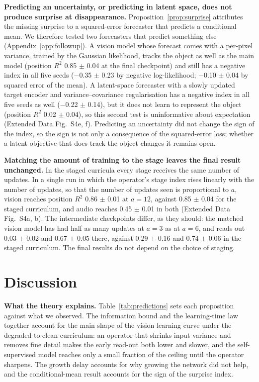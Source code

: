 \documentclass{article}
\theoremstyle{plain}
\theoremstyle{remark}
\begin{document}
\textbf{Predicting an uncertainty, or predicting in latent space, does not produce surprise at disappearance.} Proposition~\ref{prop:surprise} attributes the missing surprise to a squared-error forecaster that predicts a conditional mean. We therefore tested two forecasters that predict something else (Appendix~\ref{app:followup}). A vision model whose forecast comes with a per-pixel variance, trained by the Gaussian likelihood, tracks the object as well as the main model (position \(R^2\) 0.85 \ensuremath{\pm} 0.04 at the final checkpoint) and still has a negative index in all five seeds (\ensuremath{-}0.35 \ensuremath{\pm} 0.23 by negative log-likelihood; \ensuremath{-}0.10 \ensuremath{\pm} 0.04 by squared error of the mean). A latent-space forecaster with a slowly updated target encoder and variance--covariance regularisation has a negative index in all five seeds as well (\ensuremath{-}0.22 \ensuremath{\pm} 0.14), but it does not learn to represent the object (position \(R^2\) 0.02 \ensuremath{\pm} 0.04), so this second test is uninformative about expectation (Extended Data Fig.~S4e, f). Predicting an uncertainty did not change the sign of the index, so the sign is not only a consequence of the squared-error loss; whether a latent objective that does track the object changes it remains open.

\textbf{Matching the amount of training to the stage leaves the final result unchanged.} In the staged curricula every stage receives the same number of updates. In a single run in which the operator's stage index rises linearly with the number of updates, so that the number of updates seen is proportional to \(a\), vision reaches position \(R^2\) 0.86 \ensuremath{\pm} 0.01 at \(a=12\), against 0.85 \ensuremath{\pm} 0.04 for the staged curriculum, and audio reaches 0.45 \ensuremath{\pm} 0.01 in both (Extended Data Fig.~S4a, b). The intermediate checkpoints differ, as they should: the matched vision model has had half as many updates at \(a=3\) as at \(a=6\), and reads out 0.03 \ensuremath{\pm} 0.02 and 0.67 \ensuremath{\pm} 0.05 there, against 0.29 \ensuremath{\pm} 0.16 and 0.74 \ensuremath{\pm} 0.06 in the staged curriculum. The final results do not depend on the choice of staging.

\section{Discussion}
\label{sec:discussion}

\textbf{What the theory explains.} Table~\ref{tab:predictions} sets each proposition against what we observed. The information bound and the learning-time law together account for the main shape of the vision learning curve under the degraded-to-clean curriculum: an operator that shrinks input variance and removes fine detail makes the early read-out both lower and slower, and the self-supervised model reaches only a small fraction of the ceiling until the operator sharpens. The growth delay accounts for why growing the network did not help, and the conditional-mean result accounts for the sign of the surprise index.
\end{document}
